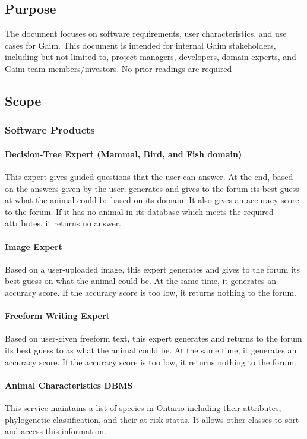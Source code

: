 \documentclass[]{article}
\begin{document}
\subsection{Purpose}
\label{sub:purpose}
The document focuses on software requirements, user characteristics, and use cases for Gaim. This document is intended for internal Gaim stakeholders, including but not limited to, project managers, developers, domain experts, and Gaim team members/investors. No prior readings are required

\subsection{Scope}
\label{sub:scope}
\subsubsection{Software Products}
\paragraph{Decision-Tree Expert (Mammal, Bird, and Fish domain)}
This expert gives guided questions that the user can answer. At the end, based on the answers given by the user, generates and gives to the forum
its best guess at what the animal could be based on its domain. It also gives an accuracy score to the forum. If it has no animal in its database which meets the required attributes, 
it returns no answer.
\paragraph{Image Expert}
Based on a user-uploaded image, this expert generates and gives to the forum its best guess on what the animal could be. At the same time, it generates an accuracy score. If the accuracy score is
too low, it returns nothing to the forum.
\paragraph{Freeform Writing Expert}
Based on user-given freeform text, this expert generates and returns to the forum its best guess to as what the animal could be. At the same time, it generates an accuracy score. If the accuracy score 
is too low, it returns nothing to the forum.
\paragraph{Animal Characteristics DBMS}
This service maintains a list of species in Ontario including their attributes, phylogenetic classification, and their at-risk status. It allows other classes to sort and access this information.
\end{document}
